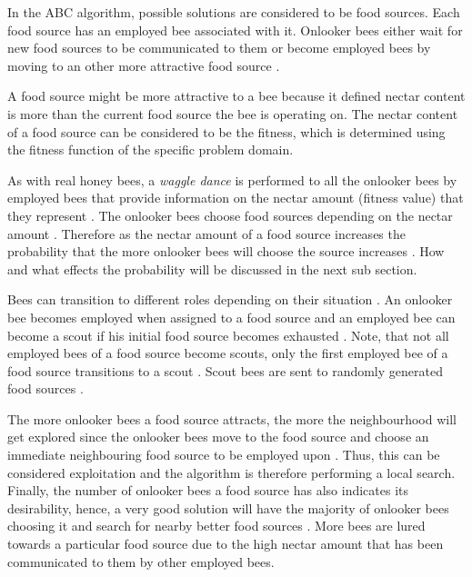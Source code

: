 In the ABC algorithm, possible solutions are considered to be food sources\cite{ABCCompareStudy,ABCNumericalOptimization}. Each food source has an employed bee associated with it. Onlooker bees either wait for new food sources to be communicated to them or become employed bees by moving to an other more attractive food source \cite{ABCCompareStudy,ABCNumericalOptimization}. 

A food source might be more attractive to a bee because it defined nectar content is more than the current food source the bee is operating on\cite{ABCCompareStudy,ABCNumericalOptimization}. The nectar content of a food source can be considered to be the fitness, which is determined using the fitness function of the specific problem domain\cite{ABCCompareStudy,ABCNumericalOptimization}.

As with real honey bees, a \emph{waggle dance} is performed to all the onlooker bees by employed bees that provide information on the nectar amount (fitness value) that they represent \cite{ABCReconfigDistro,ABCCompareStudy,ABCImageEnhancement}. The onlooker bees choose food sources depending on the nectar amount \cite{ABCReconfigDistro,ABCCompareStudy,ABCImageEnhancement}. Therefore as the nectar amount of a food source increases the probability that the more onlooker bees will choose the source increases \cite{ABCReconfigDistro,ABCCompareStudy,ABCImageEnhancement}. How and what effects the probability will be discussed in the next sub section.

Bees can transition to different roles depending on their situation \cite{ABCCompareStudy,ABCNumericalOptimization}. An onlooker bee becomes employed when assigned to a food source and an employed bee can become a scout if his initial food source becomes exhausted \cite{ABCImageEnhancement,ABCCompareStudy,ABCReconfigDistro}. Note, that not all employed bees of a food source become scouts, only the first employed bee of a food source transitions to a scout \cite{ABCImageEnhancement,ABCCompareStudy,ABCReconfigDistro}. Scout bees are sent to randomly generated food sources \cite{ABCImageEnhancement,ABCCompareStudy,ABCReconfigDistro}. 

The more onlooker bees a food source attracts, the more the neighbourhood will get explored since the onlooker bees move to the food source and choose an immediate neighbouring food source to be employed upon \cite{ABCCompareStudy,ABCNumericalOptimization}. Thus, this can be considered exploitation and the algorithm is therefore performing a local search\cite{ABCCompareStudy,ABCReconfigDistro,ABCNumericalOptimization}. Finally, the number of onlooker bees a food source has also indicates its desirability, hence, a very good solution will have the majority of onlooker bees choosing it and search for nearby better food sources \cite{ABCCompareStudy,ABCReconfigDistro,ABCNumericalOptimization}. More bees are lured towards a particular food source due to the high nectar amount that has been communicated to them by other employed bees\cite{ABCCompareStudy,ABCReconfigDistro,ABCNumericalOptimization}.

